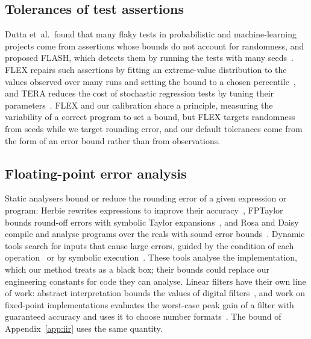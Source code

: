\documentclass[10pt,conference]{IEEEtran}
\begin{document}
\subsection{Tolerances of test assertions}
Dutta et~al.\ found that many flaky tests in probabilistic and
machine-learning projects come from assertions whose bounds do not account for
randomness, and proposed FLASH, which detects them by running the tests with
many seeds~\cite{dutta2020flaky}. FLEX repairs such assertions by fitting an
extreme-value distribution to the values observed over many runs and setting
the bound to a chosen percentile~\cite{dutta2021flex}, and TERA reduces the cost of stochastic
regression tests by tuning their parameters~\cite{dutta2021tera}.
FLEX and our calibration share a principle, measuring the variability of a
correct program to set a bound, but FLEX targets randomness from seeds while we
target rounding error, and our default tolerances come from the form of an
error bound rather than from observations.

\subsection{Floating-point error analysis}
Static analysers bound or reduce the rounding error of a given expression or
program: Herbie rewrites expressions to improve their
accuracy~\cite{panchekha2015herbie}, FPTaylor bounds round-off errors with
symbolic Taylor expansions~\cite{solovyev2019fptaylor}, and Rosa and Daisy
compile and analyse programs over the reals with sound error
bounds~\cite{darulova2014rosa,darulova2018daisy}. Dynamic tools search for
inputs that cause large errors, guided by the condition of each
operation~\cite{zou2020atomu} or by symbolic
execution~\cite{guo2020fpgen}. These tools analyse the implementation, which
our method treats as a black box; their bounds could replace our
engineering constants for code they can analyse. Linear filters have their
own line of work: abstract interpretation bounds the values of digital
filters~\cite{feret2004filters,monniaux2005filters}, and work on fixed-point
implementations evaluates the worst-case peak gain of a filter with
guaranteed accuracy and uses it to choose number
formats~\cite{volkova2015wcpg,lopez2014formatting}. The bound of
Appendix~\ref{app:iir} uses the same quantity.
\end{document}
